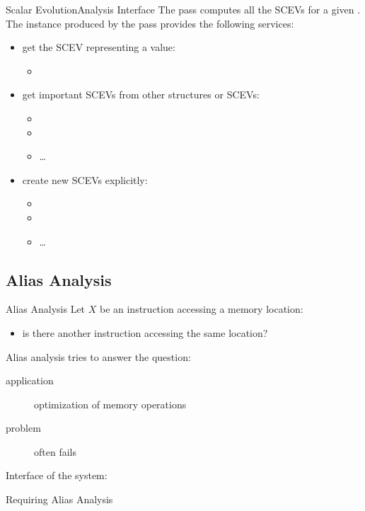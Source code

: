 \begin{frame}{Scalar Evolution}{Analysis Interface}
\centering
The  pass computes all the
SCEVs for a given .
\vfill
\centering
The  instance produced by the pass
provides the following services:
\vfill
\begin{itemize}
\item get the SCEV representing a value:
\begin{itemize}
\item      {}
\end{itemize}
\vfill
\item get important SCEVs from other structures or SCEVs:
\begin{itemize}
\item      {}
\item      {}
\item      \ldots
\end{itemize}
\vfill
\item create new SCEVs explicitly:
\begin{itemize}
\item {}
\item {}
\item \ldots
\end{itemize}
\end{itemize}
\end{frame}


\subsection{Alias Analysis}


\begin{frame}{Alias Analysis}
Let $X$ be an instruction accessing a memory location:

\begin{itemize}
\item is there another instruction accessing the same location?
\end{itemize}

\vfill
Alias analysis tries to answer the question:

\begin{description}
\item[application] optimization of memory operations
\item[problem] often fails
\end{description}

\vfill
Interface of the system: 

\begin{block}{Requiring Alias Analysis}
\centering
{}
\end{block}
\end{frame}


